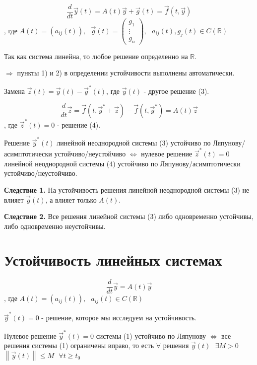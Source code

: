 \documentclass[12pt, a4paper]{report}
\begin{document}
\[ \frac{d}{dt }  \vec{y } (t ) = A (t ) \vec{y } + \vec{ g } (t) = \vec{f } (t,\vec{y } )   \tag{3}  \] 
, где \( \displaystyle A(t ) = (a_{ij }(t) ) , \text{ }  \vec{g } (t ) = \begin{pmatrix}
g_1\\
\vdots\\
g_n
\end{pmatrix} , \text{ }  a_{ij }  (t ) , g_j(t )\in  C(\mathbb{R}) \) 

Так как система линейна, то любое решение определенно на \( \mathbb{R} \). 

\( \Rightarrow  \) пункты 1) и 2) в определении устойчивости выполнены автоматически. 

Замена \( \vec{z } (t) = \vec{y } (t )- \vec{y }^* (t)\), где  \( \vec{y } (t) \)   - другое решение (3). 

\[ \frac{d}{dt }  \vec{z }  = \vec{f } (t, \vec{y } ^* +\vec{z } ) - \vec{f } (t, \vec{y } ^*)  = A(t )\vec{z} \tag{4}\] 
, где \( \vec{z }^* (t )= 0 \)  - решение (4). 

\begin{theorem}
    Решение \( \vec{y } ^{* } (t) \) линейной неоднородной  системы (3) устойчиво по Ляпунову/асимптотически устойчиво/неустойчиво \( \Leftrightarrow  \) нулевое решение \( \vec{z } ^{* } (t) = 0 \) линейной неоднородной системы (4) устойчиво по Ляпунову/асимптотически устойчиво/неустойчиво. 
\end{theorem}

\textbf{Следствие 1.} На устойчивость решения линейной неоднородной системы (3) не влияет \( \vec{g } (t) \), а влияет  только \( A(t). \) 

\textbf{Следствие 2.} Все решения линейной системы (3) либо одновременно устойчивы, либо одновременно неустойчивы. 

\section{Устойчивость линейных системах}

\[ \frac{d}{dt }  \vec{y }  = A (t ) \vec{y } \tag{1}  \] 
, где \( \displaystyle  A (t ) = (a_{ij } (t)) , \text{ }  a_{ij }(t) \in  C(\mathbb{R})  \) 

\( \vec{y } ^* (t ) = 0 \) -  решение, которое мы исследуем на устойчивость. 

\begin{theorem}
    Нулевое решение  \( \vec{y } ^{* }  (t )  = 0 \) системы (1) устойчиво по Ляпунову \( \Leftrightarrow  \) все решения системы (1) ограничены вправо, то есть \( \forall   \) решения \( \vec{y } (t) \text{ }  \exists  M >0 \)  \( \left\lVert \vec{y} (t) \right\rVert \le M \text{  } \forall t \ge  t_0 \) 
\end{theorem}
\end{document}
